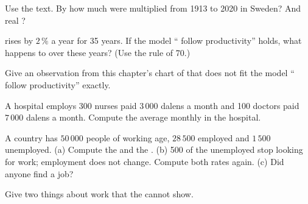 \begin{exercise}[$\star\star$]\label{exo:g8:jobs-wages-unemployment:7}
Use the text. By how much were  multiplied from 1913 to 2020 in Sweden? And real ?
\end{exercise}

\begin{exercise}[$\star\star$]\label{exo:g8:jobs-wages-unemployment:8}
 rises by $2\,\%$ a year for 35 years. If the model `` follow productivity''
holds, what happens to  over these years? (Use the rule of 70.)
\end{exercise}

\begin{exercise}[$\star\star$]\label{exo:g8:jobs-wages-unemployment:9}
Give an observation from this chapter's chart of  that does not fit the model `` follow
productivity'' exactly.
\end{exercise}

\begin{exercise}[$\star\star\star$]\label{exo:g8:jobs-wages-unemployment:10}
A hospital employs 300 nurses paid $3\,000$ dalens a month and 100 doctors paid $7\,000$ dalens a
month. Compute the average monthly  in the hospital.
\end{exercise}

\begin{exercise}[$\star\star\star$]\label{exo:g8:jobs-wages-unemployment:11}
A country has $50\,000$ people of working age, $28\,500$ employed and $1\,500$ unemployed. (a) Compute
the  and the . (b) 500 of the unemployed stop looking for work;
employment does not change. Compute both rates again. (c) Did anyone find a job?
\end{exercise}

\begin{exercise}[$\star\star\star$]\label{exo:g8:jobs-wages-unemployment:12}
Give two things about work that the  cannot show.
\end{exercise}

